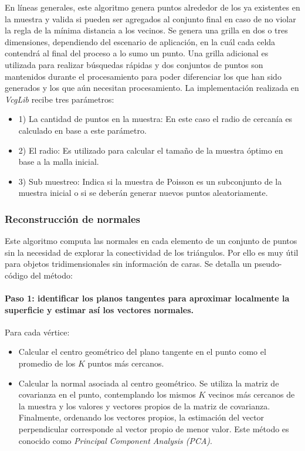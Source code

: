 En líneas generales, este algoritmo genera puntos alrededor de los ya existentes en la muestra y valida si pueden ser agregados al conjunto final en caso de no violar la regla de la mínima distancia a los vecinos. Se genera una grilla en dos o tres dimensiones, dependiendo del escenario de aplicación, en la cuál cada celda contendrá al final del proceso a lo sumo un punto. Una grilla adicional es utilizada para realizar búsquedas rápidas y dos conjuntos de puntos son mantenidos durante el procesamiento para poder diferenciar los que han sido generados y los que aún necesitan procesamiento.
La implementación realizada en \emph{VcgLib} recibe tres parámetros:
\begin{itemize}
  \item 1) La cantidad de puntos en la muestra: En este caso el radio de cercanía es calculado en base a este parámetro.
  \item 2) El radio: Es utilizado para calcular el tamaño de la muestra óptimo en base a la malla inicial.
  \item 3) Sub muestreo: Indica si la muestra de Poisson es un subconjunto de la muestra inicial o si se deberán generar nuevos puntos aleatoriamente.
\end{itemize}

\subsubsection{Reconstrucción de normales}

Este algoritmo computa las normales en cada elemento de un conjunto de puntos sin la necesidad de explorar la conectividad de los triángulos. Por ello es muy útil para objetos tridimensionales sin información de caras.
Se detalla un pseudo-código del método:

\paragraph{Paso 1: identificar los planos tangentes para aproximar localmente la superficie y estimar así los vectores normales.}

Para cada vértice:
  \begin{itemize}
    \item Calcular el centro geométrico del plano tangente en el punto como el promedio de los $K$ puntos más cercanos.
    \item Calcular la normal asociada al centro geométrico. Se utiliza la matriz de covarianza en el punto, contemplando los mismos $K$ vecinos más cercanos de la muestra y los valores y vectores propios de la matriz de covarianza. Finalmente, ordenando los vectores propios, la estimación del vector perpendicular corresponde al vector propio de menor valor. Este método es conocido como \emph{Principal Component Analysis (PCA)}.
  \end{itemize}


